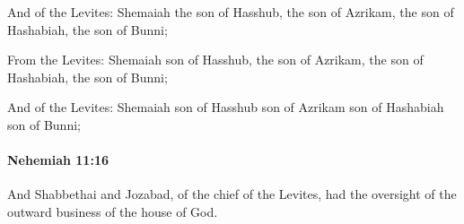 			\begin{versebox}
					\item[BHS] 
					\item[LXX] 
					\item[ASV] And of the Levites: Shemaiah the son of Hasshub, the son of Azrikam, the son of Hashabiah, the son of Bunni;
					\item[NIV] From the Levites: Shemaiah son of Hasshub, the son of Azrikam, the son of Hashabiah, the son of Bunni;
					\item[NRSV] And of the Levites: Shemaiah son of Hasshub son of Azrikam son of Hashabiah son of Bunni;
			\end{versebox}

		\paragraph{Nehemiah 11:16} %
			\label{NEHEMIAH-11-16}

			And Shabbethai and Jozabad, of the chief of the Levites, had the oversight of the outward business of the house of God.


